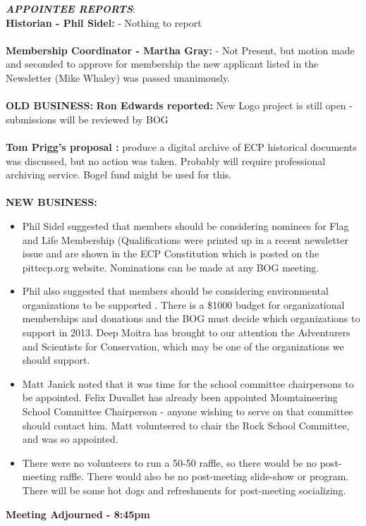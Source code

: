 \documentclass[10pt,a4paper]{article}
\begin{document}
\begin{multicols}{2}
\textit{\textbf{APPOINTEE REPORTS}}:\\ 
\textbf{   Historian - Phil Sidel:} - Nothing to report\\
\\
   \textbf{Membership Coordinator - Martha Gray:} - Not Present, but motion made and seconded to approve for membership the new applicant listed in the Newsletter (Mike Whaley) was passed unanimously.
\\
\\
\textbf{OLD BUSINESS:}
\textbf{    Ron Edwards reported: } 	New Logo project is still open - submissions will be reviewed by BOG
\\
\\
   \textbf{ Tom Prigg's proposal : } produce a digital archive of ECP historical documents was discussed, but no action was taken. 	Probably will require professional archiving service. 	Bogel fund might be used for this.  \\
   \\
\textbf{NEW BUSINESS: } 
\begin{itemize}
\item   Phil Sidel suggested that members should be considering nominees for Flag and Life Membership (Qualifications were printed up in a recent newsletter issue and are shown in the ECP Constitution which is posted on the pittecp.org website.  Nominations can be made at any BOG meeting.
\item   Phil also suggested that members should be considering environmental organizations to be supported .  There is a \$1000 budget for organizational memberships and donations and the BOG must decide which organizations to support in 2013.  Deep Moitra has brought to our attention the Adventurers and Scientists for Conservation, which may be one of the organizations we should support.
\item    Matt Janick noted that it was time for the school committee chairpersons to be appointed.   Felix Duvallet has already been appointed Mountaineering School Committee Chairperson - anyone wishing to serve on that committee should contact him.  Matt volunteered to chair the Rock School Committee, and was so appointed.
\item There were no volunteers to run a 50-50 raffle, so there would be no post-meeting raffle.  There would also be no post-meeting slide-show or program.  There will be some hot dogs and refreshments for post-meeting socializing.
\end{itemize}
\textbf{Meeting Adjourned - 8:45pm}





\end{multicols}
\end{document}

